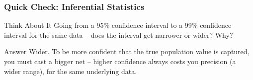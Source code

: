\begin{frame}[fragile]\frametitle{Quick Check: Inferential Statistics}
\begin{block}{Think About It}
Going from a 95\% confidence interval to a 99\% confidence interval for the same data -- does the interval get narrower or wider? Why?
\end{block}
\pause
\begin{block}{Answer}
Wider. To be more confident that the true population value is captured, you must cast a bigger net -- higher confidence always costs you precision (a wider range), for the same underlying data.
\end{block}
\end{frame}




	  
